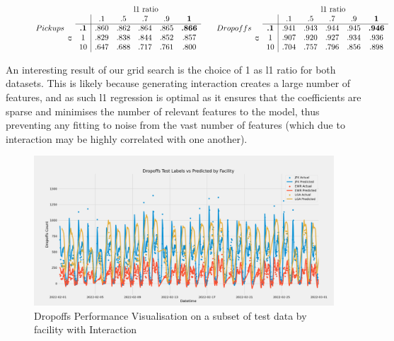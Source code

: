 \documentclass[11pt]{article}
\begin{document}
\begin{figure}[H]

\[
    Pickups
  \begin{array}{cc|ccccc}
    &\multicolumn{1}{c}{} & \multicolumn{5}{c}{\text{l1 ratio}} \\
    && .1 & .5 & .7 & .9 & \textbf{1} \\
    \cline{2-7}
    & \textbf{.1} & .860 & .862 & .864 & .865 & \textbf{.866} \\
    \smash{\rotatebox[origin=c]{90}{\text{$\alpha$}}} & 1 & .829 & .838 & .844 & .852 & .857 \\
    & 10 & .647 & .688 & .717 & .761 & .800
  \end{array}
  \qquad
  Dropoffs
    \begin{array}{cc|ccccc}
    &\multicolumn{1}{c}{} & \multicolumn{5}{c}{\text{l1 ratio}} \\
    && .1 & .5 & .7 & .9 & \textbf{1} \\
    \cline{2-7}
    & \textbf{.1} & .941 & .943 & .944 & .945 & \textbf{.946} \\
    \smash{\rotatebox[origin=c]{90}{\text{$\alpha$}}} & 1 & .907 & .920 & .927 & .934 & .936 \\
    & 10 & .704 & .757 & .796 & .856 & .898
  \end{array}
\]
\end{figure}

An interesting result of our grid search is the choice of 1 as l1 ratio for both datasets. This is likely because generating interaction creates a large number of features, and as such l1 regression is optimal as it ensures that the coefficients are sparse and minimises the number of relevant features to the model, thus preventing any fitting to noise from the vast number of features (which due to interaction may be highly correlated with one another).


\begin{figure}[H]
    \centering
    \caption{Dropoffs Performance Visualisation on a subset of test data by facility with Interaction}
    \label{fig:dropoffsperformanceinteraction}
\includegraphics[width=1\textwidth]{plots/Dropoffs Test vs Predicted by Facility with Interaction.png}
\end{figure}
\end{document}
